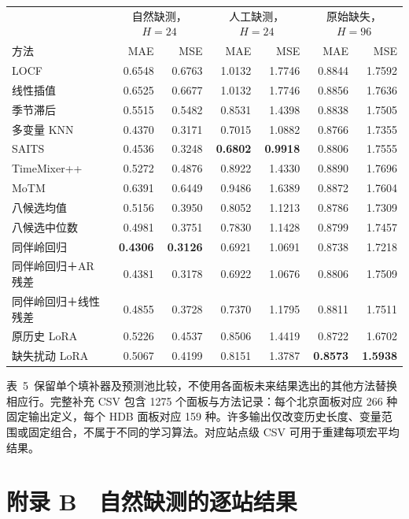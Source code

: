 \begin{tabular}{lrrrrrr}
\toprule
 & \multicolumn{2}{c}{自然缺测，$H=24$} & \multicolumn{2}{c}{人工缺测，$H=24$} & \multicolumn{2}{c}{原始缺失，$H=96$}\\
方法 & MAE & MSE & MAE & MSE & MAE & MSE\\
\midrule
LOCF & 0.6548 & 0.6763 & 1.0132 & 1.7746 & 0.8844 & 1.7592 \\
线性插值 & 0.6525 & 0.6677 & 1.0132 & 1.7746 & 0.8856 & 1.7636 \\
季节滞后 & 0.5515 & 0.5482 & 0.8531 & 1.4398 & 0.8838 & 1.7505 \\
多变量 KNN & 0.4370 & 0.3171 & 0.7015 & 1.0882 & 0.8766 & 1.7355 \\
SAITS & 0.4536 & 0.3248 & \textbf{0.6802} & \textbf{0.9918} & 0.8806 & 1.7555 \\
TimeMixer++ & 0.5272 & 0.4876 & 0.8922 & 1.4330 & 0.8890 & 1.7696 \\
MoTM & 0.6391 & 0.6449 & 0.9486 & 1.6389 & 0.8872 & 1.7604 \\
八候选均值 & 0.5156 & 0.3950 & 0.8052 & 1.1213 & 0.8786 & 1.7309 \\
八候选中位数 & 0.4981 & 0.3751 & 0.7830 & 1.1428 & 0.8799 & 1.7457 \\
同伴岭回归 & \textbf{0.4306} & \textbf{0.3126} & 0.6921 & 1.0691 & 0.8738 & 1.7218 \\
同伴岭回归＋AR 残差 & 0.4381 & 0.3178 & 0.6922 & 1.0676 & 0.8806 & 1.7509 \\
同伴岭回归＋线性残差 & 0.4855 & 0.3728 & 0.7370 & 1.1795 & 0.8811 & 1.7511 \\
原历史 LoRA & 0.5226 & 0.4537 & 0.8506 & 1.4419 & 0.8722 & 1.6702 \\
缺失扰动 LoRA & 0.5067 & 0.4199 & 0.8151 & 1.3787 & \textbf{0.8573} & \textbf{1.5938} \\
\bottomrule

\end{tabular}



表~5~保留单个填补器及预测池比较，不使用各面板未来结果选出的其他方法替换相应行。完整补充 CSV 包含 1275 个面板与方法记录：每个北京面板对应 266 种固定输出定义，每个 HDB 面板对应 159 种。许多输出仅改变历史长度、变量范围或固定组合，不属于不同的学习算法。对应站点级 CSV 可用于重建每项宏平均结果。

\section{附录 B　自然缺测的逐站结果}



